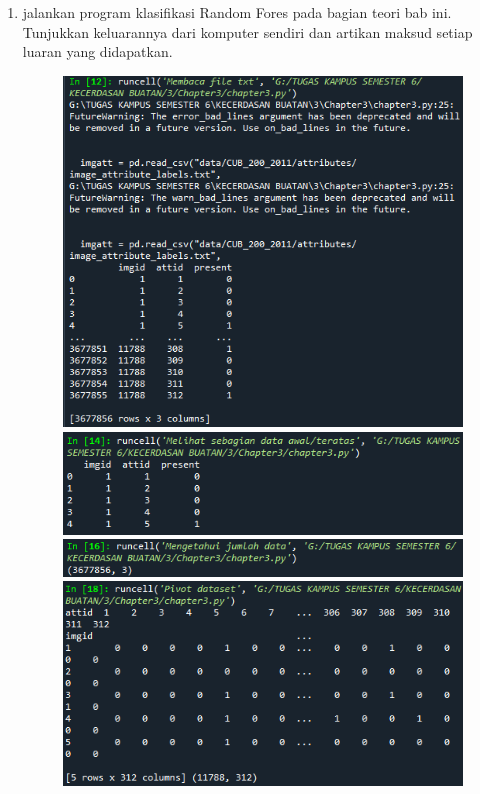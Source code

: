 \begin{enumerate}
    \item jalankan program klasifikasi Random Fores pada bagian teori bab ini. Tunjukkan keluarannya dari komputer sendiri dan artikan maksud setiap luaran yang didapatkan.
          \begin{figure}[ht]
              \centerline{\includegraphics[scale=0.7]{figures/chapter3-4.png}}
              \centerline{\includegraphics[scale=0.7]{figures/chapter3-4a.png}}
              \centerline{\includegraphics[scale=0.7]{figures/chapter3-4b.png}}
              \centerline{\includegraphics[scale=0.7]{figures/chapter3-4c.png}}

\end{figure}
\end{enumerate}
